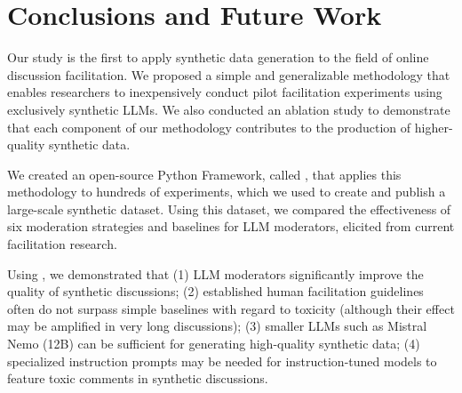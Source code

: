 %
\section{Conclusions and Future Work}

Our study is the first to apply synthetic data generation to the field of online discussion facilitation. We proposed a simple and generalizable methodology that enables researchers to inexpensively conduct pilot facilitation experiments using exclusively synthetic \acp{LLM}. We also conducted an ablation study to demonstrate that each component of our methodology contributes to the production of higher-quality synthetic data.

We created an open-source Python Framework, called \syndisco, that applies this methodology to hundreds of experiments, which we used to create and publish \vmd a large-scale synthetic dataset. Using this dataset, we compared the effectiveness of six moderation strategies and baselines for \ac{LLM} moderators, elicited from current facilitation research. 

Using \syndisco, we demonstrated that (1) \ac{LLM} moderators significantly improve the quality of synthetic discussions; (2) established human facilitation guidelines often do not surpass simple baselines with regard to toxicity (although their effect may be amplified in very long discussions); (3) smaller \acp{LLM} such as Mistral Nemo (12B) can be sufficient for generating high-quality synthetic data; (4) specialized instruction prompts may be needed for instruction-tuned models to feature toxic comments in synthetic discussions. 